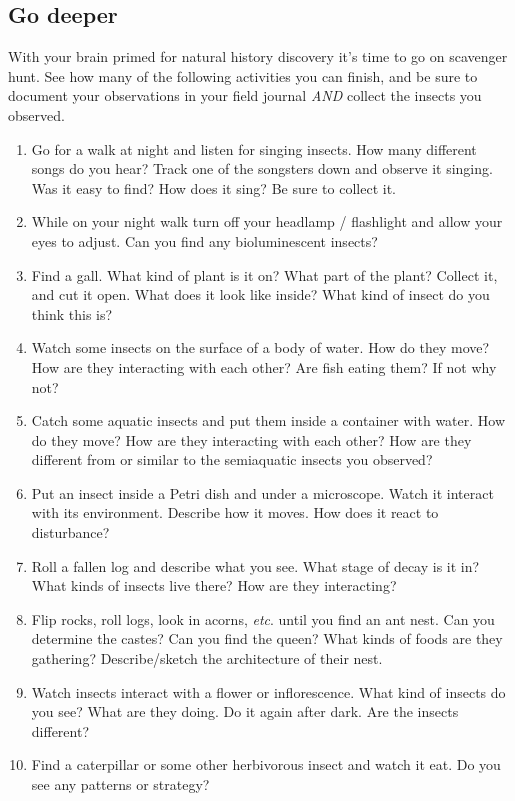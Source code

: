 \documentclass[letterpaper, 11pt]{article}
\begin{document}
\subsection*{Go deeper}
With your brain primed for natural history discovery it's time to go on scavenger hunt. See how many of the following activities you can finish, and be sure to document your observations in your field journal \textit{AND} collect the insects you observed.
\begin{enumerate}
\item Go for a walk at night and listen for singing insects. How many different songs do you hear? Track one of the songsters down and observe it singing. Was it easy to find? How does it sing? Be sure to collect it.
\item While on your night walk turn off your headlamp / flashlight and allow your eyes to adjust. Can you find any bioluminescent insects?
\item Find a gall. What kind of plant is it on? What part of the plant? Collect it, and cut it open. What does it look like inside? What kind of insect do you think this is?
\item Watch some insects on the surface of a body of water. How do they move? How are they interacting with each other? Are fish eating them? If not why not?
\item Catch some aquatic insects and put them inside a container with water. How do they move? How are they interacting with each other? How are they different from or similar to the semiaquatic insects you observed?
\item Put an insect inside a Petri dish and under a microscope. Watch it interact with its environment. Describe how it moves. How does it react to disturbance?
\item Roll a fallen log and describe what you see. What stage of decay is it in? What kinds of insects live there? How are they interacting?
\item Flip rocks, roll logs, look in acorns, \textit{etc}. until you find an ant nest. Can you determine the castes? Can you find the queen? What kinds of foods are they gathering? Describe/sketch the architecture of their nest.
\item Watch insects interact with a flower or inflorescence. What kind of insects do you see? What are they doing. Do it again after dark. Are the insects different?
\item Find a caterpillar or some other herbivorous insect and watch it eat. Do you see any patterns or strategy?

\end{enumerate}
\end{document}
